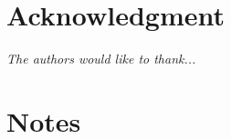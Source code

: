 \documentclass[journal,onecolumn]{IEEEtran}
\begin{document}
%
%
%
\section*{Acknowledgment}

\textit{The authors would like to thank...}


%
%
%
\section*{Notes}
\end{document}
